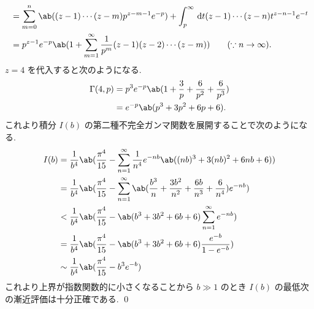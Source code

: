 \documentclass[uplatex,diffipdfmx,a4paper,11pt]{jlreq}
\makeatletter
\numberwithin{equation}{section}
\theoremstyle{definition}
\renewenvironment{proof}[1][\proofname]{\par
  \normalfont
  \topsep6\p@\@plus6\p@ \trivlist
  \item[\hskip\labelsep{\bfseries #1}\@addpunct{\bfseries}]\ignorespaces\quad\par
}{%
  \qed\endtrivlist\@endpefalse
}
\renewcommand\proofname{証明}
\makeatother
\begin{document}
\begin{proof}
\begin{align}
                 & = \sum_{m=0}^n\ab((z-1)\cdots(z-m)p^{z-m-1}e^{-p}) + \int_p^\infty\dl{t} (z-1)\cdots(z-n)t^{z-n-1}e^{-t}                \\
                 & = p^{z-1}e^{-p}\ab(1 + \sum_{m=1}^{\infty}\frac{1}{p^m}(z-1)(z-2)\cdots(z-m)) \qquad (\because n\to\infty).
  \end{align}
  $z = 4$ を代入すると次のようになる.
  \begin{align}
    \Gamma(4, p) & = p^{3}e^{-p}\ab(1 + \frac{3}{p} + \frac{6}{p^2} + \frac{6}{p^3}) \\
                 & = e^{-p}\ab(p^3 + 3p^2 + 6p + 6).
  \end{align}
  これより積分 $I(b)$ の第二種不完全ガンマ関数を展開することで次のようになる.
  \begin{align}
    I(b) & = \frac{1}{b^4}\ab(\frac{\pi^4}{15} - \sum_{n=1}^{\infty}\frac{1}{n^4}e^{-nb}\ab((nb)^3 + 3(nb)^2 + 6nb + 6))                           \\
         & = \frac{1}{b^4}\ab(\frac{\pi^4}{15} - \sum_{n=1}^{\infty}\ab(\frac{b^3}{n} + \frac{3b^2}{n^2} + \frac{6b}{n^3} + \frac{6}{n^4})e^{-nb}) \\
         & < \frac{1}{b^4}\ab(\frac{\pi^4}{15} - \ab(b^3 + 3b^2 + 6b + 6)\sum_{n=1}^{\infty}e^{-nb})                                               \\
         & = \frac{1}{b^4}\ab(\frac{\pi^4}{15} - \ab(b^3 + 3b^2 + 6b + 6)\frac{e^{-b}}{1 - e^{-b}})                                                \\
         & \sim \frac{1}{b^4}\ab(\frac{\pi^4}{15} - b^3e^{-b})
  \end{align}
  これより上界が指数関数的に小さくなることから $b\gg 1$ のとき $I(b)$ の最低次の漸近評価は十分正確である.
\end{proof}
\end{document}
